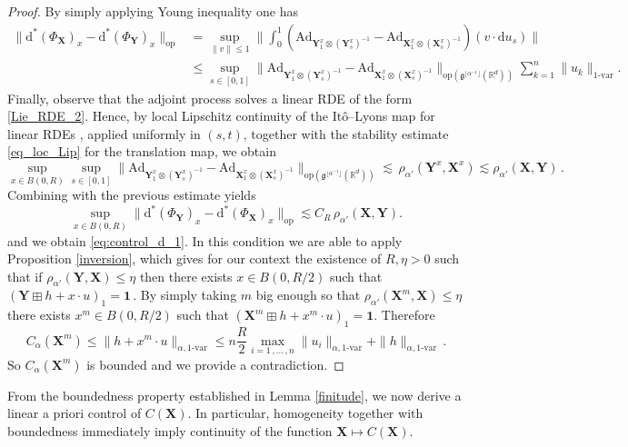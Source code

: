 \documentclass[12pt,a4paper]{article}
\numberwithin{equation}{section}
\def\fX{\mathbf{X}}
\def\fY{\mathbf{Y}}\newcommand{\norm}[1]{\left\lVert#1\right\rVert}
\theoremstyle{plain}
\theoremstyle{definition}
\theoremstyle{remark}
\begin{document}
\begin{proof}
By simply applying Young inequality one has 
\begin{align*}
\|\mathrm{d}^*(\Phi_{\mathbf{X}})_x - \mathrm{d}^*(\Phi_{\mathbf{Y}})_x\|_{\mathrm{op}}&= \sup_{\|v\|\leq 1}\| \int_0^1\left(\mathrm{Ad}_{\mathbf{Y}_1^x\otimes (\mathbf{Y}_s^x)^{-1}} -\mathrm{Ad}_{\mathbf{X}_1^x\otimes (\mathbf{X}_s^x)^{-1}}\right) (v\cdot \mathrm{d}u_{s})\|\\&
\le \sup_{s\in[0,1]} \|\mathrm{Ad}_{\mathbf{Y}_1^x\otimes (\mathbf{Y}_s^x)^{-1}} -\mathrm{Ad}_{\mathbf{X}_1^x\otimes (\mathbf{X}_s^x)^{-1}}\|_{\mathrm{op}(\mathfrak{g}^{\lfloor \alpha^{-1} \rfloor}(\mathbb{R}^d))}
\sum_{k=1}^n \|u_k\|_{1\text{-var}}.
\end{align*}
Finally, observe that the adjoint process solves a linear RDE of the form \eqref{Lie_RDE_2}. Hence, by local Lipschitz continuity of the It\^{o}--Lyons map for linear RDEs \cite[Theorem 10.26]{frizbook}, applied uniformly in \((s,t)\), together with the stability estimate \eqref{eq_loc_Lip} for the translation map, we obtain
\[
\sup_{x\in B(0,R)}\sup_{s\in[0,1]} \|\mathrm{Ad}_{\mathbf{Y}_1^x\otimes (\mathbf{Y}_s^x)^{-1}} -\mathrm{Ad}_{\mathbf{X}_1^x\otimes (\mathbf{X}_s^x)^{-1}}\|_{\mathrm{op}(\mathfrak{g}^{\lfloor \alpha^{-1} \rfloor}(\mathbb{R}^d))}
\lesssim   \, \rho_{\alpha'}(\mathbf{Y}^x,\mathbf{X}^x)\lesssim \rho_{\alpha'}(\mathbf{X},\mathbf{Y})\,.
\]
Combining with the previous estimate yields
\begin{equation}\label{second_bound}
\sup_{x\in B(0,R)} 
\|\mathrm{d}^*(\Phi_{\mathbf{Y}})_x - \mathrm{d}^*(\Phi_{\mathbf{X}})_x\|_{\mathrm{op}}
\lesssim  C_R \, \rho_{\alpha'}(\mathbf{X},\mathbf{Y}).
\end{equation}
	and we obtain \eqref{eq:control_d_1}.	In this condition we are able to apply Proposition \ref{inversion}, which gives for our context the existence of $R,\eta >0$ such that if $\rho_{\alpha'}(\fY,\fX) \leq \eta $ then  there exists  $x\in B(0,R/2)$ such that $(\fY\boxplus h+x\cdot u)_{1}=\mathbf{1}\,$. By simply taking $m$ big enough so that $\rho_{\alpha'}(\fX^m,\fX)\leq \eta$ there exists $x^m\in B(0,R/2)$ such that $(\mathbf X^m\boxplus h+x^m\cdot u)_{1}=\mathbf 1$. Therefore
\[C_{\alpha}(\mathbf X^m)\leq \|h+x^m\cdot u\|_{\alpha,1\text{-var}}\leq n\frac{R}{2}\max_{i=1\,,\ldots \,, n} \|u_i\|_{\alpha,1\text{-var}}+\|h\|_{\alpha,1\text{-var}}\,.\]
So $C_{\alpha}(\mathbf X^m)$ is bounded and we provide a contradiction. 
\end{proof}
	From the boundedness property established in Lemma \ref{finitude}, we now derive a linear a priori control of \( C(\mathbf{X}) \). In particular, homogeneity together with boundedness immediately imply continuity of the function \(\mathbf{X}\mapsto C(\mathbf{X})\). 
\end{document}
